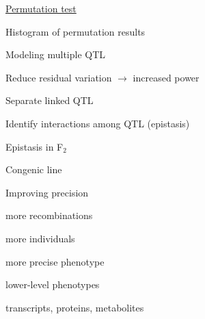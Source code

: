 \documentclass[12pt,t]{beamer}
\begin{document}
\begin{frame}[c]{\href{https://www.biostat.wisc.edu/~kbroman/presentations/BDS2017-07/perm_test}{\color{title} Permutation test}}


\end{frame}




\begin{frame}[c]{Histogram of permutation results}


\end{frame}


\begin{frame}[c]{Modeling multiple QTL}

\vspace{-20mm}

  \bbi
\item Reduce residual variation $\longrightarrow$ increased power
\item Separate linked QTL
\item Identify interactions among QTL {\lolit (epistasis)}
  \ei
\end{frame}





\begin{frame}[c]{Epistasis in F$_\text{2}$}


\end{frame}




\begin{frame}[c]{Congenic line}


\end{frame}



\begin{frame}[c]{Improving precision}

  \vspace{-20mm}

  \bbi
\item more recombinations
\item more individuals
\item more precise phenotype
\item lower-level phenotypes
\bi
\item transcripts, proteins, metabolites
  \ei
  \ei

\end{frame}
\end{document}
